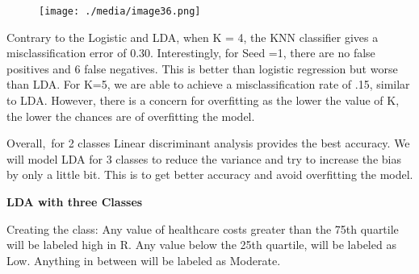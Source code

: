 \documentclass[12pt]{article}
\begin{document}
\begin{figure}[H]
	\begin{Center}
		\texttt{[image: ./media/image36.png]}
	\end{Center}
\end{figure}



\par

\begin{justify}
Contrary to the Logistic and LDA, when K = 4, the KNN classifier gives a misclassification error of 0.30. Interestingly, for Seed =1, there are no false positives and 6 false negatives. This is better than logistic regression but worse than LDA. For K=5, we are able to achieve a misclassification rate of .15, similar to LDA. However, there is a concern for overfitting as the lower the value of K, the lower the chances are of overfitting the model. 
\end{justify}\par


\vspace{\baselineskip}
\begin{justify}
Overall,\ for 2 classes Linear discriminant analysis provides the best accuracy.  We will model LDA for 3 classes to reduce the variance and try to increase the bias by only a little bit. This is to get better accuracy and avoid overfitting the model. 
\end{justify}\par


\vspace{\baselineskip}
\begin{justify}
\textbf{LDA with three Classes}
\end{justify}\par

\begin{justify}
Creating the class: Any value of healthcare costs greater than the 75th quartile will be labeled high in R. Any value below the 25th quartile, will be labeled as Low. Anything in between will be labeled as Moderate.
\end{justify}\par


\vspace{\baselineskip}

\vspace{\baselineskip}
\end{document}
